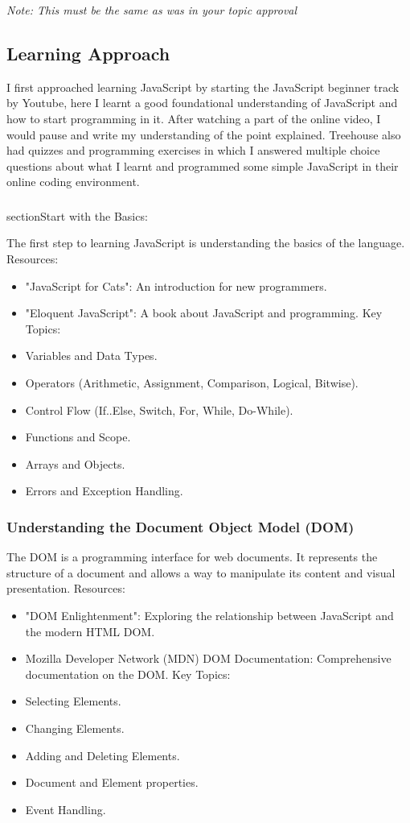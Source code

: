 \documentclass[a4paper, 11pt]{report}
\begin{document}
\textit{Note: This must be the same as was in your topic approval}


\subsection{Learning Approach}
I first approached learning JavaScript by  starting  the  JavaScript  beginner  track  by Youtube, here I learnt a good foundational understanding of JavaScript and how to start programming in it. After watching a part of the online video, I would pause and write my understanding of the  point  explained.  Treehouse also had  quizzes  and programming exercises in which I answered multiple choice questions about what I learnt and programmed some simple JavaScript in their online coding environment.

\subsubsection{}section{Start with the Basics:}

The first step to learning JavaScript is understanding the basics of the language.
Resources:
\begin{itemize}
\item	"JavaScript for Cats": An introduction for new programmers.
\item	"Eloquent JavaScript": A book about JavaScript and programming.
Key Topics:
\item	Variables and Data Types.
\item	Operators (Arithmetic, Assignment, Comparison, Logical, Bitwise).
\item	Control Flow (If..Else, Switch, For, While, Do-While).
\item	Functions and Scope.
\item	Arrays and Objects.
\item	Errors and Exception Handling.
\end{itemize}

\subsubsection{Understanding the Document Object Model (DOM)}

The DOM is a programming interface for web documents. It represents the structure of a document and allows a way to manipulate its content and visual presentation.
Resources:
\begin{itemize}
\item	"DOM Enlightenment": Exploring the relationship between JavaScript and the modern HTML DOM.
\item	Mozilla Developer Network (MDN) DOM Documentation: Comprehensive documentation on the DOM.
Key Topics:
\item	Selecting Elements.
\item	Changing Elements.
\item	Adding and Deleting Elements.
\item	Document and Element properties.
\item	Event Handling.
\end{itemize}
\end{document}
